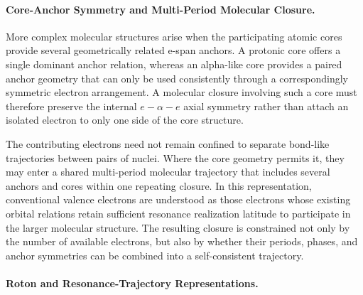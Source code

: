 \documentclass[11pt,a4paper]{article}
\begin{document}



\paragraph{Core-Anchor Symmetry and Multi-Period Molecular Closure.}
More complex molecular structures arise when the participating atomic cores provide several geometrically related e-span anchors. A protonic core offers a single dominant anchor relation, whereas an alpha-like core provides a paired anchor geometry that can only be used consistently through a correspondingly symmetric electron arrangement. A molecular closure involving such a core must therefore preserve the internal \(e-\alpha-e\) axial symmetry rather than attach an isolated electron to only one side of the core structure.

The contributing electrons need not remain confined to separate bond-like trajectories between pairs of nuclei. Where the core geometry permits it, they may enter a shared multi-period molecular trajectory that includes several anchors and cores within one repeating closure. In this representation, conventional valence electrons are understood as those electrons whose existing orbital relations retain sufficient resonance realization latitude to participate in the larger molecular structure. The resulting closure is constrained not only by the number of available electrons, but also by whether their periods, phases, and anchor symmetries can be combined into a self-consistent trajectory.

\paragraph{Roton and Resonance-Trajectory Representations.}
\end{document}
